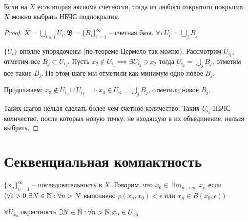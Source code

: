 \documentclass[main]{subfiles}
\begin{document}
\begin{theorem}[Линделёфа]\label{axOfCount:lindelof}
    Если на $X$ есть вторая аксиома счетности, тогда из любого открытого покрытия $X$ можно выбрать НБЧС подпокрытие.
\end{theorem}
\begin{proof}
    $X = \bigcup_{i \in I} U_i, \mathfrak{B} = \{B_i\}_{i=1}^\infty$  -- счетная база.
    $\forall i\ U_i = \bigcup_{j} B_{j}$



    $\{U_i\}$ вполне упорядочены (по теореме Цермело так можно).
    Рассмотрим $U_{i_1}$, отметим все $B_j \subset U_{i_1}$.
    Пусть $x_2 \not\in U_{i_1} \implies \exists U_{i_2} \ni x_2$
    тогда $U_{i_2} = \bigcup_j B_j$, отметим все такие $B_j$.
    На этом шаге мы отметили как минимум одно новое $B_j$.

    Продолжаем: $x_3 \not\in U_{i_1} \cup U_{i_2} \implies x_3 \in U_3 = \bigcup_j B_j$,
    отметили новое $B_j$.

    Таких шагов нельзя сделать более чем счетное количество.
    Таких  $U_{i_k}$  НБЧС количество, после которых новую точку,
    не входящую в их объединение, нельзя выбрать.
\end{proof}

\section{Секвенциальная компактность}
\begin{definition}
    $\{x_n\}_{n=1}^\infty$ -- последовательность в $X$.
    Говорим, что $x_0 \in \lim_{n \to \infty} x_n$ если
    $(\forall \varepsilon >0\ \exists N \in \mathbb{N} : \forall n > N$ выполнено $\rho(x_n, x_0) < \epsilon$ или $x_n \in B(x_0, \epsilon))$

    $\forall U_{x_0}$ окрестность $\exists N \in \mathbb{N}: \forall n > \mathbb{N} \ x_n \in U_{x_0}$
\end{definition}
\end{document}

